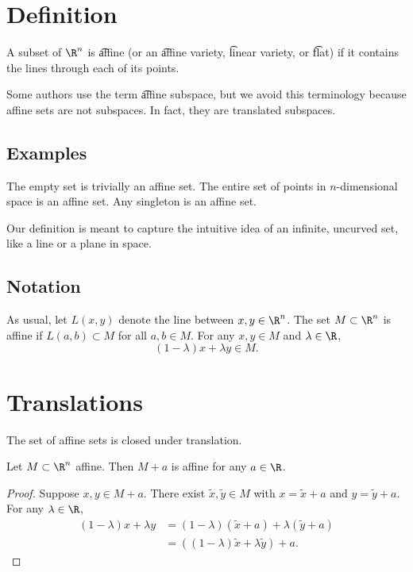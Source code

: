 

\section*{Definition}

A subset of $\R ^n$ is \t{affine} (or an \t{affine variety}, \t{linear variety}, or \t{flat}) if it contains the lines through each of its points.

Some authors use the term \t{affine subspace}, but we avoid this terminology because affine sets are not subspaces.
In fact, they are translated subspaces.

\subsection*{Examples}

The empty set is trivially an affine set.
The entire set of points in $n$-dimensional space is an affine set.
Any singleton is an affine set.

Our definition is meant to capture the intuitive idea of an infinite, uncurved set, like a line or a plane in space.

\subsection*{Notation}

As usual, let $L(x, y)$ denote the line between $x, y \in \R ^n$.
The set $M \subset \R ^n$ is affine if $L(a, b) \subset M$ for all $a, b \in M$.
For any $x, y \in M$ and $\lambda  \in \R $,
\[
(1-\lambda )x + \lambda y \in M.
\]

\section*{Translations}

The set of affine sets is closed under translation.
\begin{proposition}
Let $M \subset \R ^n$ affine.
Then $M + a$ is affine for any $a \in \R $.
\begin{proof}Suppose $x, y \in M+a$.
There exist $\tilde{x}, \tilde{y} \in M$ with $x = \tilde{x} + a$ and $y = \tilde{y} + a$.
For any $\lambda  \in \R $,
\[
\begin{aligned}
(1-\lambda )x + \lambda y & = (1-\lambda )(\tilde{x} + a) + \lambda (\tilde{y} + a) \\
&= ((1-\lambda )\tilde{x} + \lambda \tilde{y}) + a.
\end{aligned}
\]\end{proof}
\end{proposition}


